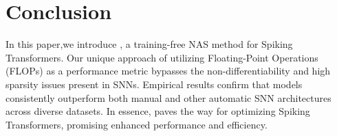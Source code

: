 \documentclass{article}
\theoremstyle{plain}
\theoremstyle{definition}
\theoremstyle{remark}
\begin{document}
\vspace{-0.15em}
\section{Conclusion}
\vspace{-0.15em}

In this paper,we introduce \sysname, a training-free NAS method for Spiking Transformers. Our unique approach of utilizing Floating-Point Operations (FLOPs) as a performance metric bypasses the non-differentiability and high sparsity issues present in SNNs. Empirical results confirm that \sysname models consistently outperform both manual and other automatic SNN architectures across diverse datasets. In essence, \sysname paves the way for optimizing Spiking Transformers, promising enhanced performance and efficiency.





\newpage
{\small


}
\end{document}
